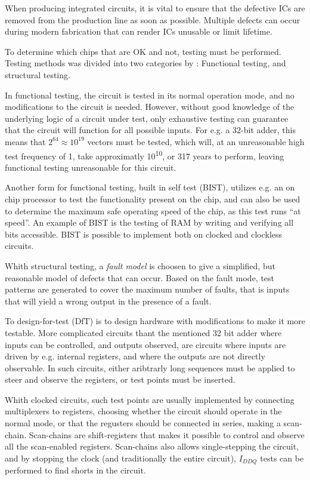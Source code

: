 When producing integrated circuits, it is vital to ensure that the
defective ICs are removed from the production line as soon as
possible. Multiple defects can occur during modern fabrication that
can render ICs unusable or limit lifetime.

To determine which chips that are OK and not, testing must be
performed. Testing methods was divided into two categories by
\cite{xxx}: Functional testing, and structural testing.

In functional testing, the circuit is tested in its normal operation
mode, and no modifications to the circuit is needed. However, without
good knowledge of the underlying logic of a circuit under test, only
exhaustive testing can guarantee that the circuit will function for
all possible inputs. For e.g. a 32-bit adder, this means that $2^{64}
\approx 10^{19}$ vectors must be tested, which will, at an
unreasonable high test frequency of \unit{1}{\giga \hertz}, take
approximatly \unit{10^{10}}{\second}, or 317 years to perform, leaving
functional testing unreasonable for this circuit.

Another form for functional testing, built in self test
(BIST), utilizes e.g. an on
chip processor to test the functionality present on the chip, and can
also be used to determine the maximum safe operating speed of the
chip, as this test runs ``at speed''. An example of BIST is the
testing of RAM by writing and verifying all bits accessible. BIST is
possible to implement both on clocked and clockless circuits.

Whith structural testing, a \emph{fault model} is choosen to give a
simplified, but reasonable model of defects that can occur. Based on
the fault mode, test patterns are generated to cover the maximum
number of faults, that is inputs that will yield a wrong output in the
presence of a fault.

To design-for-test (DfT) is to
design hardware with modifications to make it more testable. More
complicated circuits thant the mentioned 32 bit adder where inputs can
be controlled, and outputs observed, are circuits where inputs are
driven by e.g. internal registers, and where the outputs are not
directly observable. In such circuits, either aribtrarly long
sequences must be applied to steer and observe the registers, or test
points must be inserted.

Whith clocked circuits, such test points are usually implemented by
connecting multiplexers to registers, choosing whether the circuit
should operate in the normal mode, or that the regusters should be
connected in series, making a scan-chain. Scan-chains are
shift-registers that makes it possible to control and observe all the
scan-enabled registers. Scan-chains also allows single-stepping the
circuit, and by stopping the clock (and traditionally the entire
circuit), $I_{DDQ}$ tests can be performed to find shorts in the
circuit.

